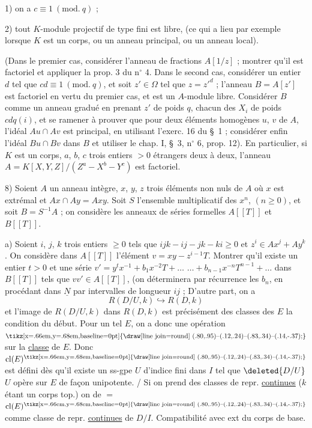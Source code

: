 1) on a $c\equiv 1\ (\mathrm{mod.}\ q)$ ;

2) tout $K$-module projectif de type fini est libre, (ce qui a lieu par exemple lorsque $K$ est un corps, ou un anneau principal, ou un anneau local).

(Dans le premier cas, considérer l'anneau de fractions $A[1/z]$ ; montrer qu'il est factoriel et appliquer la prop. 3 du n$^{\circ}$ 4. Dans le second cas, considérer un entier $d$ tel que $cd\equiv 1\ (\mathrm{mod.}\ q)$, et soit $z'\in\Omega$ tel que $z=z'^{d}$ ; l'anneau $B=A[z']$ est factoriel en vertu du premier cas, et est un $A$-module libre. Considérer $B$ comme un anneau gradué en prenant $z'$ de poids $q$, chacun des $X_i$ de poids $cdq(i)$, et se ramener à prouver que pour deux éléments homogènes $u$, $v$ de $A$, l'idéal $Au\cap Av$ est principal, en utilisant l'exerc. 16 du \S~1 ; considérer enfin l'idéal $Bu\cap Bv$ dans $B$ et utiliser le chap. I, \S~3, n$^{\circ}$ 6, prop. 12). En particulier, si $K$ est un corps, $a$, $b$, $c$ trois entiers $>0$ étrangers deux à deux, l'anneau $A=K[X,Y,Z]/(Z^a-X^b-Y^c)$ est factoriel.

8) Soient $A$ un anneau intègre, $x$, $y$, $z$ trois éléments non nuls de $A$ où $x$ est extrémal et $Ax\cap Ay=Axy$. Soit $S$ l'ensemble multiplicatif des $x^n$, $(n\geq 0)$, et soit $B=S^{-1}A$ ; on considère les anneaux de séries formelles $A[[T]]$ et $B[[T]]$.

a) Soient $i$, $j$, $k$ trois entiers $\geq 0$ tels que $ijk-ij-jk-ki\geq 0$ et $z^i\in Ax^j+Ay^k$. On considère dans $A[[T]]$ l'élément $v=xy-z^{i-1}T$. Montrer qu'il existe un entier $t>0$ et une série $v'=y^t x^{-1}+b_1x^{-2}T+\ldots$ $\ldots+b_{n-1}x^{-n}T^{n-1}+\ldots$ dans $B[[T]]$ tels que $vv'\in A[[T]]$, (on déterminera par récurrence les $b_n$, en procédant dans $\underline{N}$ par intervalles de longueur $ij$ ;
D'autre part, on a
\[
 R(D/U,k)\hookrightarrow R(D,k)
\]
et l'image de $R(D/U,k)$ dans $R(D,k)$ est précisément  des classes des $E$  la condition du début. Pour un tel $E$, on a donc une opération $\mathord{\text{\tikz[x=.66em,y=.68em,baseline=0pt]{\draw[line join=round] (.80,.95)--(.12,.24)--(.83,.34)--(.14,-.37);}}}$ sur la \uline{classe} de $E$. Donc $\operatorname{cl}(E)^{\mathord{\text{\tikz[x=.66em,y=.68em,baseline=0pt]{\draw[line join=round] (.80,.95)--(.12,.24)--(.83,.34)--(.14,-.37);}}}}$ est défini dès qu'il existe un ss-gpe  $U$ d'indice fini dans $I$ tel que $\deleted{D/U}$ $U$ opère sur $E$ de façon unipotente. / Si on prend des classes de repr. \uline{continues} ($k$ étant un corps top.) on   de $=$ $\operatorname{cl}(E)^{\mathord{\text{\tikz[x=.66em,y=.68em,baseline=0pt]{\draw[line join=round] (.80,.95)--(.12,.24)--(.83,.34)--(.14,-.37);}}}}$ comme classe de repr. \uline{continues} de $D/I$. Compatibilité avec ext du corps de base.

